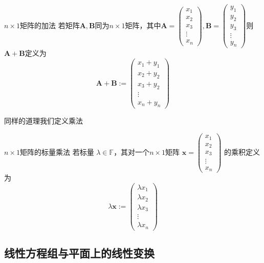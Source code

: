 \begin{definition}{$n\times 1$矩阵的加法}
	若矩阵$\mathbf{A},\mathbf{B}$同为$n\times 1$矩阵，其中$\mathbf{A}=\begin{pmatrix}  
		x_1 \\  
		x_2 \\
		x_3 \\
		\vdots \\
		x_n  
	  \end{pmatrix},\mathbf{B}=\begin{pmatrix}  
		y_1 \\  
		y_2 \\
		y_3 \\
		\vdots \\
		y_n  
	  \end{pmatrix}  $则$\mathbf{A}+\mathbf{B}$定义为$$\mathbf{A}+\mathbf{B}:=\begin{pmatrix}  
		x_1+y_1 \\  
		x_2+y_2 \\
		x_3+y_2 \\
		\vdots \\
		x_n+y_n  
		\end{pmatrix}$$
\end{definition}

同样的道理我们定义乘法

\begin{definition}{$n\times 1$矩阵的标量乘法}
	若标量 $\lambda\in \mathbb{F}$，其对一个$n\times 1$矩阵 $\boldsymbol{x} = \begin{pmatrix}  
		x_1 \\  
		x_2 \\
		x_3 \\
		\vdots \\
		x_n  
		\end{pmatrix}$ 的乘积定义为$$\lambda\boldsymbol{x}:=\begin{pmatrix}  
				\lambda x_1 \\  
				\lambda x_2 \\
				\lambda x_3 \\
				\vdots \\
				\lambda x_n  
				\end{pmatrix}$$
\end{definition}

\subsection{线性方程组与平面上的线性变换}

